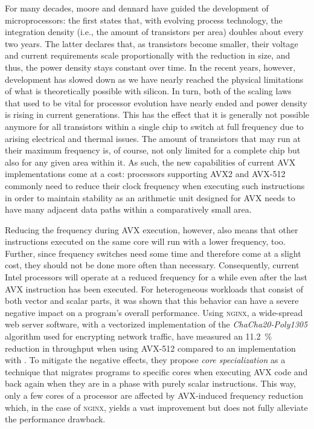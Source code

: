 {For many decades, \gls{moore} and \gls{dennard} have guided the development of microprocessors: the first states that, with evolving process technology, the integration density (i.e., the amount of transistors per area) doubles about every two years. The latter declares that, as transistors become smaller, their voltage and current requirements scale proportionally with the reduction in size, and thus, the power density stays constant over time. In the recent years, however, development has slowed down as we have nearly reached the physical limitations of what is theoretically possible with silicon. In turn, both of the scaling laws that used to be vital for processor evolution have nearly ended and power density is rising in current generations. This has the effect that it is generally not possible anymore for all transistors within a single chip to switch at full frequency due to arising electrical and thermal issues. The amount of transistors that may run at their maximum frequency is, of course, not only limited for a complete chip but also for any given area within it. As such, the new capabilities of current \gls{AVX} implementations come at a cost: processors supporting \gls{AVX2} and \gls{AVX-512} commonly need to reduce their clock frequency when executing such instructions in order to maintain stability as an arithmetic unit designed for \gls{AVX} needs to have many adjacent data paths within a comparatively small area.

Reducing the frequency during \gls{AVX} execution, however, also means that other instructions executed on the same core will run with a lower frequency, too. Further, since frequency switches need some time and therefore come at a slight cost, they should not be done more often than necessary. Consequently, current Intel processors will operate at a reduced frequency for a while even after the last \gls{AVX} instruction has been executed. For heterogeneous workloads that consist of both vector and scalar parts, it was shown that this behavior can have a severe negative impact on a program's overall performance. Using \textsc{nginx}, a wide-spread web server software, with a vectorized implementation of the \textit{ChaCha20-Poly1305} algorithm used for encrypting network traffic, \citeauthor{gottschlag19sfma} \cite{gottschlag19sfma} have measured an \SI{11.2}{\percent} reduction in throughput when using \gls{AVX-512} compared to an implementation with . To mitigate the negative effects, they propose \emph{core specialization} as a technique that migrates programs to specific cores when executing \gls{AVX} code and back again when they are in a phase with purely scalar instructions. This way, only a few cores of a processor are affected by \gls{AVX}-induced frequency reduction which, in the case of \textsc{nginx}, yields a vast improvement but does not fully alleviate the performance drawback.

}
